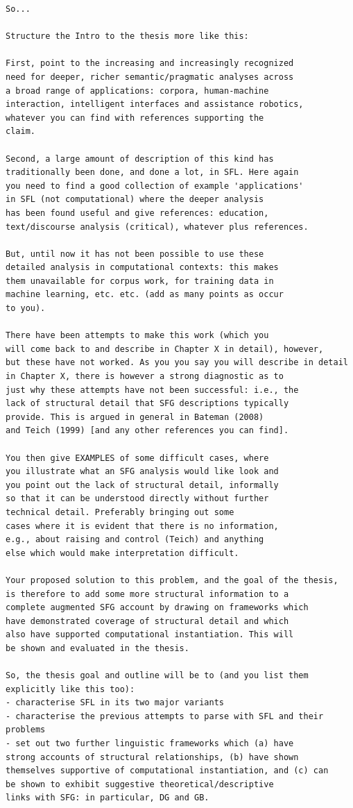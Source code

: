 \begin{Verbatim}
So...

Structure the Intro to the thesis more like this:

First, point to the increasing and increasingly recognized
need for deeper, richer semantic/pragmatic analyses across
a broad range of applications: corpora, human-machine
interaction, intelligent interfaces and assistance robotics,
whatever you can find with references supporting the
claim.

Second, a large amount of description of this kind has
traditionally been done, and done a lot, in SFL. Here again
you need to find a good collection of example 'applications'
in SFL (not computational) where the deeper analysis
has been found useful and give references: education,
text/discourse analysis (critical), whatever plus references.

But, until now it has not been possible to use these
detailed analysis in computational contexts: this makes
them unavailable for corpus work, for training data in
machine learning, etc. etc. (add as many points as occur
to you).

There have been attempts to make this work (which you
will come back to and describe in Chapter X in detail), however,
but these have not worked. As you you say you will describe in detail
in Chapter X, there is however a strong diagnostic as to
just why these attempts have not been successful: i.e., the
lack of structural detail that SFG descriptions typically
provide. This is argued in general in Bateman (2008)
and Teich (1999) [and any other references you can find].

You then give EXAMPLES of some difficult cases, where
you illustrate what an SFG analysis would like look and
you point out the lack of structural detail, informally
so that it can be understood directly without further
technical detail. Preferably bringing out some
cases where it is evident that there is no information,
e.g., about raising and control (Teich) and anything
else which would make interpretation difficult.

Your proposed solution to this problem, and the goal of the thesis,
is therefore to add some more structural information to a
complete augmented SFG account by drawing on frameworks which
have demonstrated coverage of structural detail and which
also have supported computational instantiation. This will
be shown and evaluated in the thesis.

So, the thesis goal and outline will be to (and you list them
explicitly like this too):
- characterise SFL in its two major variants
- characterise the previous attempts to parse with SFL and their problems
- set out two further linguistic frameworks which (a) have
strong accounts of structural relationships, (b) have shown
themselves supportive of computational instantiation, and (c) can
be shown to exhibit suggestive theoretical/descriptive
links with SFG: in particular, DG and GB.


\end{Verbatim}

